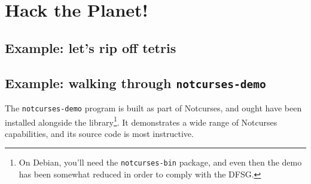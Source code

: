 \documentclass[letterpaper,10pt]{article}
\begin{document}
\section{Hack the Planet!}
\subsection{Example: let's rip off tetris}
\label{section:casestudy}
\subsection{Example: walking through \texttt{notcurses-demo}}
The \texttt{notcurses-demo} program is built as part of Notcurses, and ought
have been installed alongside the library\footnote{On Debian, you'll need the
\texttt{notcurses-bin} package, and even then the demo has been somewhat
reduced in order to comply with the DFSG\cite{dfsg}.}. It demonstrates a wide
range of Notcurses capabilities, and its source code is most instructive.
\end{document}
